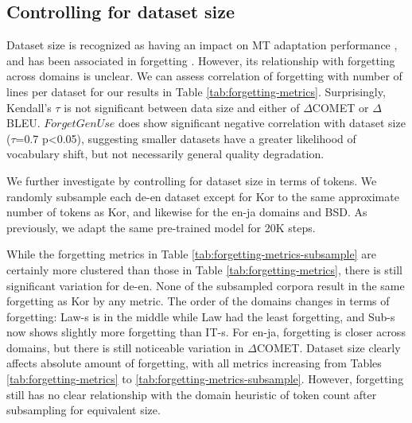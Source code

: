\documentclass[11pt]{article}
\begin{document}


\subsection{Controlling for dataset size}

Dataset size is recognized as having an impact on MT adaptation performance \cite{sharaf-etal-2020-meta}, and has been associated in forgetting \cite{pham-etal-2020-study}. However, its relationship with forgetting across domains is unclear. We can assess correlation of forgetting with number of lines per dataset for our results in Table \ref{tab:forgetting-metrics}. Surprisingly,  Kendall's $\tau$ is not significant between data size and either of $\Delta$COMET or $\Delta$BLEU. $ForgetGenUse$ does show significant negative correlation with dataset size ($\tau$=0.7 p<0.05), suggesting smaller datasets have a greater likelihood of vocabulary shift, but not necessarily general quality degradation. %


We further investigate by controlling for dataset size in terms of tokens. We randomly subsample each de-en dataset except for Kor to the same approximate number of tokens as Kor, and likewise for the en-ja domains and BSD. As previously, we adapt the same pre-trained model for 20K steps.

While the forgetting metrics in Table \ref{tab:forgetting-metrics-subsample} are certainly more clustered than those in Table \ref{tab:forgetting-metrics}, there is still significant variation for de-en. None of the subsampled corpora result in the same forgetting as Kor by any metric. The order of the domains changes in terms of forgetting: Law-s is in the middle while Law had the least forgetting, and Sub-s now shows slightly more forgetting than IT-s. For en-ja, forgetting is closer across domains, but there is still noticeable variation in $\Delta$COMET. Dataset size clearly affects absolute amount of forgetting, with all metrics increasing from Tables   \ref{tab:forgetting-metrics} to \ref{tab:forgetting-metrics-subsample}. However, forgetting still has no clear relationship with the domain heuristic of token count after subsampling for equivalent size.
\end{document}
